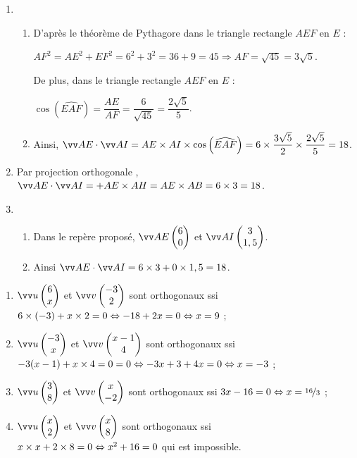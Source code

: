 \documentclass[a4paper,11pt]{article}
\begin{document}
\medskip


\begin{enumerate}
	\item 
	\begin{enumerate}
		\item D'après le théorème de Pythagore dans le triangle rectangle $AEF$ en $E$ :
		
		\hspace{0.5cm}$AF^2=AE^2+EF^2=6^2+3^2=36+9=45 \Rightarrow AF=\sqrt{45}=3\sqrt{5}$.
		
		De plus, dans le triangle rectangle $AEF$ en $E$ :
		
		\hspace{0.5cm}$\cos\left(\widehat{EAF}\right)=\dfrac{AE}{AF}=\dfrac{6}{\sqrt{45}}=\dfrac{2\sqrt{5}}{5}$.
		\item Ainsi, $\vect{AE}\cdot\vect{AI}=AE \times AI \times \cos\left(\widehat{EAF}\right)=6 \times \dfrac{3\sqrt{5}}{2} \times \dfrac{2\sqrt{5}}{5}=18$.
	\end{enumerate}
	\item Par \og projection orthogonale \fg, $\vect{AE}\cdot\vect{AI}=+AE\times AH=AE \times AB=6 \times 3=18$.
	\item 
	\begin{enumerate}
		\item Dans le repère proposé, $\vect{AE}\coordeux{6}{0}$ et $\vect{AI}\coordeux{3}{1,5}$.
		\item Ainsi $\vect{AE}\cdot\vect{AI}=6 \times 3 + 0 \times 1,5=18$.
	\end{enumerate}  
\end{enumerate}

\medskip


\begin{enumerate}
	\item $\vect{u}\coordeux{6}{x}$ et $\vect{v}\coordeux{-3}{2}$ sont orthogonaux ssi $6\times(-3)+x\times2=0 \Leftrightarrow -18+2x=0 \Leftrightarrow x=9$ ;
	\item $\vect{u}\coordeux{-3}{x}$ et $\vect{v}\coordeux{x-1}{4}$ sont orthogonaux ssi $-3(x-1)+x\times4=0=0 \Leftrightarrow -3x+3+4x=0 \Leftrightarrow x=-3$ ;
	\item $\vect{u}\coordeux{3}{8}$ et $\vect{v}\coordeux{x}{-2}$ sont orthogonaux ssi $3x-16=0 \Leftrightarrow x=\nicefrac{16}{3}$ ;
	\item $\vect{u}\coordeux{x}{2}$ et $\vect{v}\coordeux{x}{8}$ sont orthogonaux ssi $x\times x+2\times8=0 \Leftrightarrow x^2+16=0$ qui est impossible.
\end{enumerate}
\end{document}

